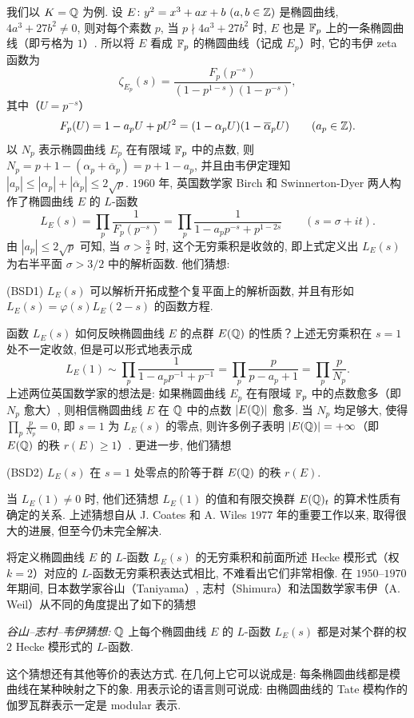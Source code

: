 我们以 $K=\mathbb{Q}$ 为例. 设 $E\colon y^2=x^3+ax+b\ (a,b\in\mathbb{Z})$ 是椭圆曲线, $4a^3+27b^2\neq 0$, 则对每个素数 $p$, 当 $p\nmid 4a^3+27b^2$ 时, $E$ 也是 $\mathbb{F}_p$ 上的一条椭圆曲线（即亏格为 $1$）. 所以将 $E$ 看成 $\mathbb{F}_p$ 的椭圆曲线（记成 $E_p$）时, 它的韦伊 zeta 函数为
\[
  \zeta_{E_p}(s)=\frac{F_p(p^{-s})}{(1-p^{1-s})(1-p^{-s})},
\]
其中（$U=p^{-s}$）
\[
  F_p(U)=1-a_pU+pU^2=(1-\alpha_pU)(1-\overline{\alpha}_pU)\qquad(a_p\in\mathbb{Z}).
\]
以 $N_p$ 表示椭圆曲线 $E_p$ 在有限域 $\mathbb{F}_p$ 中的点数, 则 $N_p=p+1-(\alpha_p+\overline{\alpha}_p)=p+1-a_p$, 并且由韦伊定理知 $|a_p|\leqslant|\alpha_p|+|\overline{\alpha}_p|\leqslant 2\sqrt{p}$. $1960$ 年, 英国数学家 Birch 和 Swinnerton-Dyer 两人构作了椭圆曲线 $E$ 的 $L$-函数
\[
  L_E(s)=\prod_p\frac{1}{F_p(p^{-s})}
  =\prod_p\frac{1}{1-a_pp^{-s}+p^{1-2s}}\qquad(s=\sigma+it).
\]
由 $|a_p|\leqslant 2\sqrt{p}$ 可知, 当 $\sigma>\frac{3}{2}$ 时, 这个无穷乘积是收敛的, 即上式定义出 $L_E(s)$ 为右半平面 $\sigma>3/2$ 中的解析函数. 他们猜想:

(BSD1) $L_E(s)$ 可以解析开拓成整个复平面上的解析函数, 并且有形如 $L_E(s)=\varphi(s)L_E(2-s)$ 的函数方程.

函数 $L_E(s)$ 如何反映椭圆曲线 $E$ 的点群 $E(\mathbb{Q})$ 的性质？上述无穷乘积在 $s=1$ 处不一定收敛, 但是可以形式地表示成
\[
  L_E(1)\sim\prod_p\frac{1}{1-a_pp^{-1}+p^{-1}}
  =\prod_p\frac{p}{p-a_p+1}=\prod_p\frac{p}{N_p}.
\]
上述两位英国数学家的想法是: 如果椭圆曲线 $E_p$ 在有限域 $\mathbb{F}_p$ 中的点数愈多（即 $N_p$ 愈大）, 则相信椭圆曲线 $E$ 在 $\mathbb{Q}$ 中的点数 $|E(\mathbb{Q})|$ 愈多. 当 $N_p$ 均足够大, 使得 $\prod_p\frac{p}{N_p}=0$, 即 $s=1$ 为 $L_E(s)$ 的零点, 则许多例子表明 $|E(\mathbb{Q})|=+\infty$（即 $E(\mathbb{Q})$ 的秩 $r(E)\geqslant 1$）. 更进一步, 他们猜想

(BSD2) $L_E(s)$ 在 $s=1$ 处零点的阶等于群 $E(\mathbb{Q})$ 的秩 $r(E)$.

当 $L_E(1)\neq 0$ 时, 他们还猜想 $L_E(1)$ 的值和有限交换群 $E(\mathbb{Q})_t$ 的算术性质有确定的关系. 上述猜想自从 J. Coates 和 A. Wiles $1977$ 年的重要工作以来, 取得很大的进展, 但至今仍未完全解决.

将定义椭圆曲线 $E$ 的 $L$-函数 $L_E(s)$ 的无穷乘积和前面所述 Hecke 模形式（权 $k=2$）对应的 $L$-函数无穷乘积表达式相比, 不难看出它们非常相像. 在 $1950$--$1970$ 年期间, 日本数学家谷山（Taniyama）, 志村（Shimura）和法国数学家韦伊（A. Weil）从不同的角度提出了如下的猜想

\emph{谷山--志村--韦伊猜想:} $\mathbb{Q}$ 上每个椭圆曲线 $E$ 的 $L$-函数 $L_E(s)$ 都是对某个群的权 $2$ Hecke 模形式的 $L$-函数.

这个猜想还有其他等价的表达方式. 在几何上它可以说成是: 每条椭圆曲线都是模曲线在某种映射之下的象. 用表示论的语言则可说成: 由椭圆曲线的 Tate 模构作的伽罗瓦群表示一定是 modular 表示.

